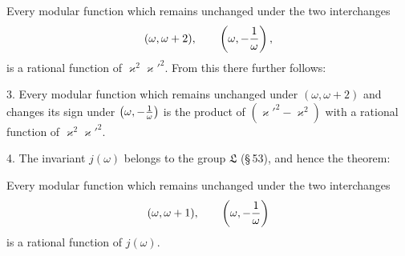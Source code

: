 \documentclass[11pt]{article}
\begin{document}
Every modular function which remains unchanged under the two interchanges
\[
(\omega,\omega+2),
\qquad
\left(\omega,-{1\over\omega}\right),
\]
is a rational function of $\varkappa^2\varkappa'^2$. From this there further follows:

3. Every modular function which remains unchanged under $(\omega,\omega+2)$ and changes its sign under $\left(\omega,-{1\over\omega}\right)$ is the product of $(\varkappa'^2-\varkappa^2)$ with a rational function of $\varkappa^2\varkappa'^2$.

4. The invariant $j(\omega)$ belongs to the group $\mathfrak L$ (\S\,53), and hence the theorem:

Every modular function which remains unchanged under the two interchanges
\[
(\omega,\omega+1),
\qquad
\left(\omega,-{1\over\omega}\right)
\]
is a rational function of $j(\omega)$.
\end{document}
